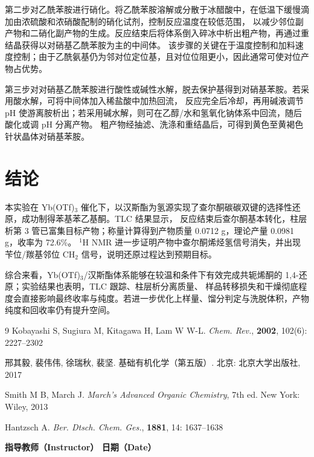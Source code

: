 \documentclass[a4paper]{article}
\newcommand{\zihaoWu}{\fontsize{10.5pt}{16pt}\selectfont}
\begin{document}
第二步对乙酰苯胺进行硝化。将乙酰苯胺溶解或分散于冰醋酸中，在低温下缓慢滴加由浓硫酸和浓硝酸配制的硝化试剂，控制反应温度在较低范围，
以减少邻位副产物和二硝化副产物的生成。反应结束后将体系倒入碎冰中析出粗产物，再通过重结晶获得以对硝基乙酰苯胺为主的中间体。
该步骤的关键在于温度控制和加料速度控制；由于乙酰氨基仍为邻对位定位基，且对位位阻更小，因此通常可使对位产物占优势。

第三步对对硝基乙酰苯胺进行酸性或碱性水解，脱去保护基得到对硝基苯胺。若采用酸水解，可将中间体加入稀盐酸中加热回流，
反应完全后冷却，再用碱液调节 pH 使游离胺析出；若采用碱水解，则可在乙醇/水和氢氧化钠体系中回流，随后酸化或调 pH 分离产物。
粗产物经抽滤、洗涤和重结晶后，可得到黄色至黄褐色针状晶体对硝基苯胺。

\section{结论}
\vspace{-0.5em}

本实验在 Yb(OTf)$_3$ 催化下，以汉斯酯为氢源实现了查尔酮碳碳双键的选择性还原，成功制得苯基苯乙基酮。TLC 结果显示，
反应结束后查尔酮基本转化，柱层析第 3 管已富集目标产物；称量计算得到产物质量 0.0712 g，理论产量 0.0981 g，收率为 72.6\%。
$^1$H NMR 进一步证明产物中查尔酮烯烃氢信号消失，并出现苄位/羰基邻位 CH$_2$ 信号，说明还原过程达到预期目标。

综合来看，Yb(OTf)$_3$/汉斯酯体系能够在较温和条件下有效完成共轭烯酮的 1,4-还原；实验结果也表明，TLC 跟踪、柱层析分离质量、
样品转移损失和干燥彻底程度会直接影响最终收率与纯度。若进一步优化上样量、馏分判定与洗脱体积，产物纯度和回收率仍有提升空间。

\vspace{3em}
{\footnotesize
	\begin{thebibliography}{9}
		Kobayashi S, Sugiura M, Kitagawa H, Lam W W-L.
		\textit{Chem. Rev.}, \textbf{2002}, 102(6): 2227--2302

		邢其毅, 裴伟伟, 徐瑞秋, 裴坚.
		{\kaishu 基础有机化学（第五版）}.
		北京: 北京大学出版社, 2017

		Smith M B, March J.
		\textit{March's Advanced Organic Chemistry}, 7th ed.
		New York: Wiley, 2013

		Hantzsch A.
		\textit{Ber. Dtsch. Chem. Ges.}, \textbf{1881}, 14: 1637--1638
	\end{thebibliography}
}


\vspace*{\fill}
\noindent{\zihaoWu 评语（Remarks）：}

\vspace{2em}

\begin{center}
	{\zihaoWu\bfseries 指导教师（Instructor）\hspace{8em} 日期（Date）}
\end{center}

\vspace{1.5cm}
\end{document}
